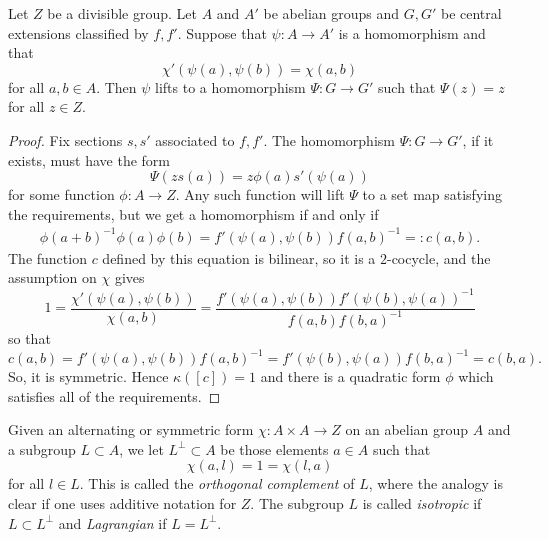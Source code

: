 \documentclass[11pt]{amsart}
\begin{document}
\begin{lem}\label{lem:lift}
Let $Z$ be a divisible group. Let $A$ and $A'$ be abelian groups and $G,G'$ be central extensions classified by $f,f'$. Suppose that $\psi \colon A \to A'$ is a homomorphism and that
\[\chi'(\psi(a),\psi(b)) = \chi(a,b)\]
for all $a,b\in A$. Then $\psi$ lifts to a homomorphism $\Psi \colon G \to G'$ such that $\Psi(z)=z$ for all $z\in Z$.
\end{lem}
\begin{proof}
Fix sections $s,s'$ associated to $f,f'$. The homomorphism $\Psi \colon G \to G'$, if it exists,  must have the form
\[\Psi(zs(a)) = z\phi(a) s'(\psi(a))\]
for some function $\phi \colon A \to Z$. Any such function will lift $\Psi$ to a set map satisfying the requirements, but
we get  a homomorphism if and only if
\begin{align}\label{eq:fphi} \phi(a+b)^{-1}\phi(a)\phi(b) =  f'(\psi(a),\psi(b))f(a,b)^{-1} =:c(a,b) .
\end{align}
The function $c$ defined by this equation is bilinear, so it is a $2$-cocycle, and
the assumption on $\chi$ gives
\[1=\frac{\chi'(\psi(a),\psi(b))}{\chi(a,b)} =\frac{f'(\psi(a),\psi(b))f'(\psi(b),\psi(a))^{-1}}{f(a,b)f(b,a)^{-1}}  \]
so that
\[ c(a,b)=f'(\psi(a),\psi(b))f(a,b)^{-1} =f'(\psi(b),\psi(a))f(b,a)^{-1} = c(b,a) .\]
So, it is symmetric.  Hence $\kappa([c])=1$ and there is a quadratic form $\phi$ which satisfies all of the requirements.
\end{proof}

\begin{defn}\label{defn:compLag}
Given an alternating or symmetric form $\chi \colon A \times A\to Z$ on an abelian group $A$ and a subgroup $L\subset A$, we let $L^\perp\subset A$ be those elements $ a \in A$ such that
\[\chi(a,l ) =  1 = \chi(l,a) \]
for all $l \in L$. This is called the \emph{orthogonal complement} of $L$, where the analogy is clear if one uses additive notation for $Z$. The subgroup $L$ is called \emph{isotropic} if $L\subset L^\perp$ and \emph{Lagrangian} if $L=L^\perp$.
\end{defn}
\end{document}

